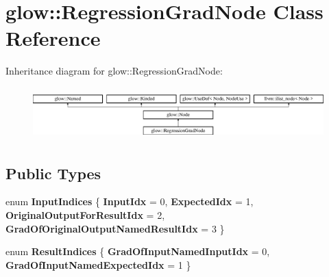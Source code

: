 \hypertarget{classglow_1_1_regression_grad_node}{}\section{glow\+:\+:Regression\+Grad\+Node Class Reference}
\label{classglow_1_1_regression_grad_node}
Inheritance diagram for glow\+:\+:Regression\+Grad\+Node\+:\begin{figure}[H]
\begin{center}
\leavevmode
\includegraphics[height=2.028986cm]{classglow_1_1_regression_grad_node}
\end{center}
\end{figure}
\subsection*{Public Types}
\begin{DoxyCompactItemize}
\item 
\mbox{\label{classglow_1_1_regression_grad_node_af3f759f1069be7b150303272451b24e1}} 
enum {\bfseries Input\+Indices} \{ {\bfseries Input\+Idx} = 0, 
{\bfseries Expected\+Idx} = 1, 
{\bfseries Original\+Output\+For\+Result\+Idx} = 2, 
{\bfseries Grad\+Of\+Original\+Output\+Named\+Result\+Idx} = 3
 \}
\item 
\mbox{\label{classglow_1_1_regression_grad_node_adac58e9153aa6d8bc25ebd7c283a8494}} 
enum {\bfseries Result\+Indices} \{ {\bfseries Grad\+Of\+Input\+Named\+Input\+Idx} = 0, 
{\bfseries Grad\+Of\+Input\+Named\+Expected\+Idx} = 1
 \}
\end{DoxyCompactItemize}
